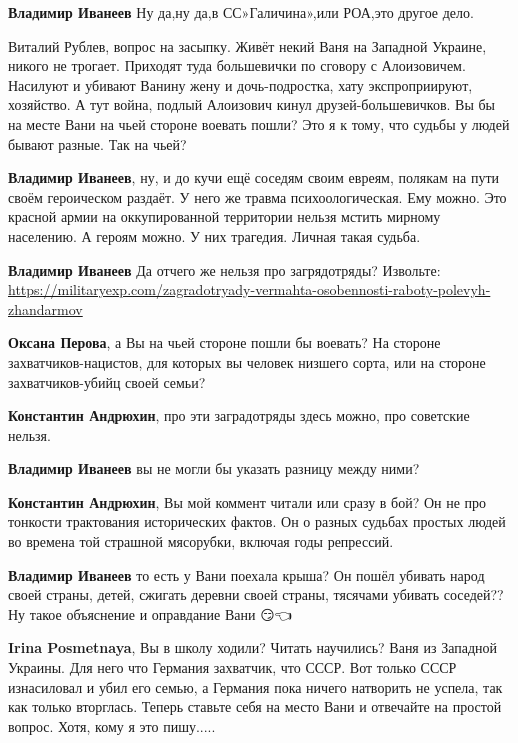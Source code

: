 \begin{itemize}
\begin{itemize}
\begin{itemize}
\textbf{Владимир Иванеев} Ну да,ну да,в СС»Галичина»,или РОА,это другое дело.


Виталий Рублев, вопрос на засыпку. Живёт некий Ваня на Западной Украине, никого
не трогает. Приходят туда большевички по сговору с Алоизовичем. Насилуют и
убивают Ванину жену и дочь-подростка, хату экспроприируют, хозяйство. А тут
война, подлый Алоизович кинул друзей-большевичков. Вы бы на месте Вани на чьей
стороне воевать пошли? Это я к тому, что судьбы у людей бывают разные. Так на
чьей?

\textbf{Владимир Иванеев}, ну, и до кучи ещё соседям своим евреям, полякам на
пути своём героическом раздаёт. У него же травма психоологическая. Ему можно.
Это красной армии на оккупированной территории нельзя мстить мирному населению.
А героям можно. У них трагедия. Личная такая судьба.


\textbf{Владимир Иванеев} Да отчего же нельзя про загрядотряды? Извольте:
\url{https://militaryexp.com/zagradotryady-vermahta-osobennosti-raboty-polevyh-zhandarmov}

\textbf{Оксана Перова}, а Вы на чьей стороне пошли бы воевать? На стороне
захватчиков-нацистов, для которых вы человек низшего сорта, или на стороне
захватчиков-убийц своей семьи?

\textbf{Константин Андрюхин}, про эти заградотряды здесь можно, про советские нельзя.

\textbf{Владимир Иванеев} вы не могли бы указать разницу между ними?

\textbf{Константин Андрюхин}, Вы мой коммент читали или сразу в бой? Он не про
тонкости трактования исторических фактов. Он о разных судьбах простых людей во
времена той страшной мясорубки, включая годы репрессий.

\textbf{Владимир Иванеев} то есть у Вани поехала крыша? Он пошёл убивать народ
своей страны, детей, сжигать деревни своей страны, тясячами убивать соседей??
Ну такое объяснение и оправдание Вани 😏👈

\textbf{Irina Posmetnaya}, Вы в школу ходили? Читать научились? Ваня из
Западной Украины. Для него что Германия захватчик, что СССР. Вот только СССР
изнасиловал и убил его семью, а Германия пока ничего натворить не успела, так
как только вторглась. Теперь ставьте себя на место Вани и отвечайте на простой
вопрос. Хотя, кому я это пишу.....


\end{itemize}
\end{itemize}
\end{itemize}
